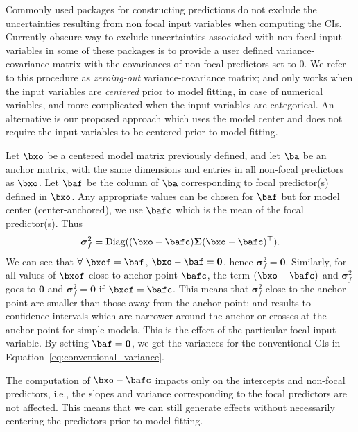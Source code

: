 Commonly used  packages for constructing predictions do not exclude the uncertainties resulting from non focal input variables when computing the CIs. Currently obscure way to exclude uncertainties associated with non-focal input variables in some of these packages is to provide a user defined variance-covariance matrix with the covariances of non-focal predictors set to $0$. We refer to this procedure as \emph{zeroing-out} variance-covariance matrix; and only works when the input variables are \emph{centered} prior to model fitting, in case of numerical variables, and more complicated when the input variables are categorical. An alternative is our proposed approach which uses the model center and does not require the input variables to be centered prior to model fitting.

Let $\bxo$ be a centered model matrix previously defined, and let $\ba$ be an anchor matrix, with the same dimensions and entries in all non-focal predictors as $\bxo$. Let $\baf$ be the column of $\ba$ corresponding to focal predictor(s) defined in $\bxo$. Any appropriate values can be chosen for $\baf$ but for model center (center-anchored), we use $\bafc$ which is the mean of the focal predictor(s). Thus 
%
\begin{align}\label{eq:centered_variance}
\boldsymbol\sigma_f^2 = \textrm{Diag}((\bxo - \bafc) \boldsymbol{\Sigma} (\bxo - \bafc)^\top).
\end{align}
%
We can see that $\forall ~\bxof=\baf$, $\bxo - \baf = \boldsymbol 0$, hence $\boldsymbol\sigma_f^2 = \boldsymbol{0}$. Similarly, for all values of $\bxof$ close to anchor point $\bafc$, the term $(\bxo - \bafc)$ and $\boldsymbol\sigma_f^2$ goes to $\boldsymbol 0$ and $\boldsymbol\sigma_f^2 = \boldsymbol 0$ if $\bxof=\bafc$. This means that $\boldsymbol\sigma_f^2$ close to the anchor point are smaller than those away from the anchor point; and results to confidence intervals which are narrower around the anchor or crosses at the anchor point for simple models. This is the effect of the particular focal input variable. By setting $\baf = \boldsymbol 0$, we get the variances for the conventional CIs in Equation~\ref{eq:conventional_variance}.


The computation of $\bxo - \bafc$ impacts only on the intercepts and non-focal predictors, i.e., the slopes and variance corresponding to the focal predictors are not affected. This means that we can still generate effects without necessarily centering the predictors prior to model fitting.

